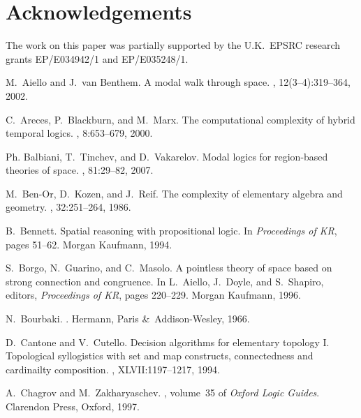 \documentclass{LMCS}
\theoremstyle{plain}
\begin{document}
\section*{Acknowledgements}

The work on this paper was
partially supported by the U.K.\ EPSRC research grants
EP/E034942/1 and EP/E035248/1.






\begin{thebibliography}{10}

M.~Aiello and J.~van Benthem.
\newblock A modal walk through space.
, 12(3--4):319--364,
  2002.

C.~Areces, P.~Blackburn, and M.~Marx.
\newblock The computational complexity of hybrid temporal logics.
, 8:653--679, 2000.

Ph. Balbiani, T.~Tinchev, and D.~Vakarelov.
\newblock Modal logics for region-based theories of space.
, 81:29--82, 2007.

M.~Ben-Or, D.~Kozen, and J.~Reif.
\newblock The complexity of elementary algebra and geometry.
, 32:251--264, 1986.

B.~Bennett.
\newblock Spatial reasoning with propositional logic.
\newblock In {\em Proceedings of KR}, pages 51--62. Morgan Kaufmann, 1994.

S.~Borgo, N.~Guarino, and C.~Masolo.
\newblock A pointless theory of space based on strong connection and
  congruence.
\newblock In L.~Aiello, J.~Doyle, and S.~Shapiro, editors, {\em Proceedings of
  KR}, pages 220--229. Morgan Kaufmann, 1996.

N.~Bourbaki.
.
\newblock Hermann, Paris \&\ Addison-Wesley, 1966.

D.~Cantone and V.~Cutello.
\newblock Decision algorithms for elementary topology {I}. {T}opological
  syllogistics with set and map constructs, connectedness and cardinailty
  composition.
, XLVII:1197--1217, 1994.

A.~Chagrov and M.~Zakharyaschev.
, volume~35 of {\em Oxford Logic Guides}.
\newblock Clarendon Press, Oxford, 1997.


\end{thebibliography}
\end{document}
